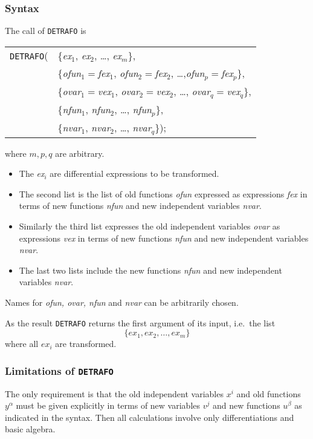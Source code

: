 \subsubsection{Syntax}
The call of \texttt{DETRAFO} is
\begin{flushleft}
\begin{tabular}{@{}l@{}l}
\texttt{DETRAFO}(&\{\textit{ex}$_1$, \textit{ex}$_2$, \ldots , \textit{ex}$_m$\}, \\
              &\{\textit{ofun}$_1=$\textit{fex}$_1$, \textit{ofun}$_2=$\textit{fex}$_2$,
               \ldots ,\textit{ofun}$_p=$\textit{fex}$_p$\}, \\
              &\{\textit{ovar}$_1=$\textit{vex}$_1$, \textit{ovar}$_2=$\textit{vex}$_2$, \ldots ,
                  \textit{ovar}$_q=$\textit{vex}$_q$\}, \\
              &\{\textit{nfun}$_1$, \textit{nfun}$_2$, \ldots , \textit{nfun}$_p$\},\\
              &\{\textit{nvar}$_1$, \textit{nvar}$_2$, \ldots , \textit{nvar}$_q$\});
\end{tabular}     
\end{flushleft}
where $m,p,q$ are arbitrary.
\begin{itemize}
\item
The \textit{ex}$_i$ are differential expressions to be transformed.
\item
The second list is the list of old functions \textit{ofun} expressed
as expressions \textit{fex} in terms
of new functions \textit{nfun} and new independent variables \textit{nvar}.
\item
Similarly the third list expresses the old independent variables \textit{ovar}
as expressions \textit{vex} in terms of new functions
\textit{nfun} and new independent variables \textit{nvar}.
\item
The last two lists include the new functions \textit{nfun}
and new independent variables \textit{nvar}.
\end{itemize}
Names for \textit{ofun, ovar, nfun} and \textit{nvar} can be arbitrarily
chosen.

As the result \texttt{DETRAFO} returns the first argument of its input,
i.e.\ the list
\[\{\textit{ex}_1, \textit{ex}_2, \ldots , \textit{ex}_m\}\]
where all $\textit{ex}_i$ are transformed.
\subsubsection{Limitations of \texttt{DETRAFO}}
The only requirement is that
the old independent variables $x^i$ and old functions $y^\alpha$ must be
given explicitly in terms of new variables $v^j$ and new functions $u^\beta$
as indicated in the syntax.
Then all calculations involve only differentiations and basic algebra.
